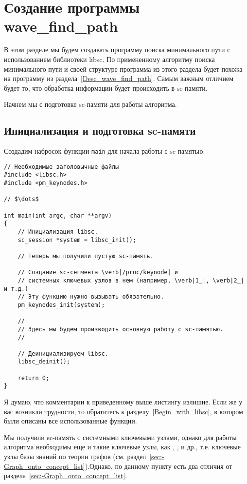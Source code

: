 \section{Созданиe программы wave\_find\_path}

В этом разделе мы будем создавать программу поиска минимального пути с
использованием библиотеки libsc. По примененному алгоритму поиска
минимального пути и своей структуре программа из этого раздела будет
похожа на программу из раздела~\ref{Desc_wave_find_path}. Самым важным
отличием будет то, что обработка информации будет происходить в
sc-памяти.

Начнем мы с подготовке sc-памяти для работы алгоритма.

\subsection{Инициализация и подготовка sc-памяти}

Создадим набросок функции \lstinline|main| для начала работы с
sc-памятью:
\begin{lstlisting}[texcl]
// Необходимые заголовычные файлы
#include <libsc.h>
#include <pm_keynodes.h>

// $\dots$

int main(int argc, char **argv)
{
    // Инициализация libsc.
    sc_session *system = libsc_init();

    // Теперь мы получили пустую sc-память.

    // Создание sc-сегмента \verb|/proc/keynode| и
    // системных ключевых узлов в нем (например, \verb|1_|, \verb|2_| и т.д.)
    // Эту функцию нужно вызывать обязательно.
    pm_keynodes_init(system);

    //
    // Здесь мы будем производить основную работу с sc-памятью.
    //

    // Деинициализируем libsc.
    libsc_deinit();

    return 0;
}
\end{lstlisting}

Я думаю, что комментарии к приведенному выше листингу излишне. Если же
у вас возникли трудности, то обратитесь к
разделу~\ref{Begin_with_libsc}, в котором были описаны все
использованные функции.

Мы получили sc-память с системными ключевыми узлами, однако для работы
алгоритма необходимы еще и такие ключевые узлы, как
, ,  и др.,
т.е. ключевые узлы базы знаний по теории графов
(см. раздел~\ref{sec:-Graph_onto_concept_list}).Однако, по данному
пункту есть два отличия от раздела~\ref{sec:-Graph_onto_concept_list}.

